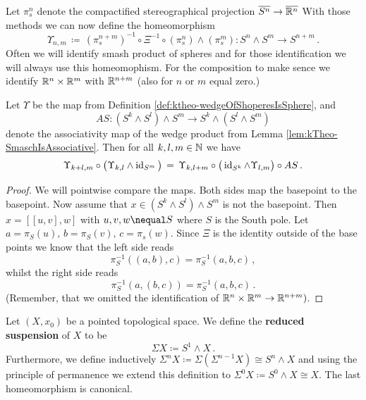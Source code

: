 \begin{definition} [Convention]\label{def:ktheo-wedgeOfShoperesIsSphere}
	Let $\pi_s^n$ denote the compactified stereographical projection $\overline{S^n}\to \overline{\mathbb{R}^n}$ 
	With those methods we can now define the homeomorphism 
	\begin{equation*}
		\Upsilon_{n,m}\, \coloneq \,(\pi_s^{n+m})^{-1}\circ \Xi^{-1}\circ (\pi_s^n)\wedge (\pi_s^m) :S^n\wedge S^m \to S^{n+m}\,.
	\end{equation*} Often we will identify smash product of spheres and for those identification we will always use this homeomophism. For the composition to make sence we identify $\mathbb{R}^n\times \mathbb{R}^m$ with $\mathbb{R}^{n+m}$ (also for $n$ or $m$ equal zero.)
\end{definition}
\begin{remark}\label{rem:kTheo-AssoziativityOfUspilon}
	Let $\Upsilon$ be the map from Definition \ref{def:ktheo-wedgeOfShoperesIsSphere}, and 
		\begin{equation*}
			AS:(S^k\wedge S^l)\wedge S^m \to S^k\wedge ( S^l\wedge S^m)
		\end{equation*}
	denote the associativity map of the wedge product from Lemma \ref{lem:kTheo-SmaschIsAssociative}. Then for all $k,l,m\in \mathbb{N}$ we have
	\begin{equation*}
		\Upsilon_{k+l,m}\circ \big(\Upsilon_{k,l}\wedge \operatorname{\mathrm{id}}_{S^m}\big)\,=\, \Upsilon_{k,l+m}\circ \big(\operatorname{\mathrm{id}}_{S^k}\wedge \Upsilon_{l,m}\big)\circ AS\,.
	\end{equation*}
\end{remark}
\begin{proof}
	We will pointwise compare the maps. Both sides map the basepoint to the basepoint. Now assume that $x\in (S^k\wedge S^l)\wedge S^m$ is not the basepoint. Then $x=[[u,v],w]$ with $u,v,w \nequal S$ where $S$ is the South pole. Let $a=\pi_S(u),\, b=\pi_S(v),\,c=\pi_s(w)$. Since $\Xi$ is the identity outside of the base points we know that the left side reads
	\begin{equation*}
		\pi_S^{-1}((a,b),c)=\pi_S^{-1}(a,b,c)\,,
	\end{equation*}whilst the right side reads
	\begin{equation*}
		\pi_S^{-1}(a,(b,c))=\pi_S^{-1}(a,b,c)\,.
	\end{equation*}(Remember, that we omitted the identification of $\mathbb{R}^n\times \mathbb{R}^m\to \mathbb{R}^{n+m})$.
\end{proof}
\begin{definition}
	Let $(X,x_0)$ be a pointed topological space. We define the \textbf{reduced suspension} of $X$ to be 
	\begin{equation*}
		\Sigma X\coloneq S^1\wedge X \,.
	\end{equation*} 
	Furthermore, we define inductively $\Sigma^nX\coloneq \Sigma (\Sigma^{n-1}X)\cong S^n\wedge X$ and using the principle of permanence we extend this definition to $\Sigma^0X\coloneq S^0\wedge X\cong X$. The last homeomorphism is canonical.
\end{definition}

